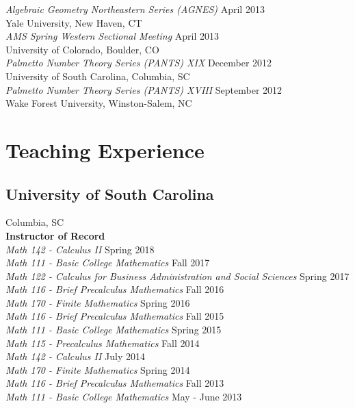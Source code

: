 \documentclass{article}
\begin{document}
  \noindent\textsl{Algebraic Geometry Northeastern Series (AGNES)} \hfill April 2013\\
  Yale University, New Haven, CT\\

  \noindent\textsl{AMS Spring Western Sectional Meeting} \hfill April 2013\\
  University of Colorado, Boulder, CO\\

  \noindent\textsl{Palmetto Number Theory Series (PANTS) XIX} \hfill December 2012\\
  University of South Carolina, Columbia, SC\\

  \noindent\textsl{Palmetto Number Theory Series (PANTS) XVIII} \hfill September 2012\\
  Wake Forest University, Winston-Salem, NC\\

  \section*{Teaching Experience}
  \subsection*{University of South Carolina}
  \noindent Columbia, SC\\
  
  \noindent\textbf{Instructor of Record}\\
  \textsl{Math 142 - Calculus II} \hfill Spring 2018\\
  \textsl{Math 111 - Basic College Mathematics} \hfill Fall 2017\\
  \textsl{Math 122 - Calculus for Business Administration and Social Sciences} \hfill Spring 2017\\
  \textsl{Math 116 - Brief Precalculus Mathematics} \hfill Fall 2016\\
  \textsl{Math 170 - Finite Mathematics} \hfill Spring 2016\\
  \textsl{Math 116 - Brief Precalculus Mathematics} \hfill Fall 2015\\
  \textsl{Math 111 - Basic College Mathematics} \hfill Spring 2015\\
  \textsl{Math 115 - Precalculus Mathematics} \hfill Fall 2014\\
  \textsl{Math 142 - Calculus II} \hfill July 2014\\
  \textsl{Math 170 - Finite Mathematics} \hfill Spring 2014\\
  \textsl{Math 116 - Brief Precalculus Mathematics} \hfill Fall 2013\\
  \textsl{Math 111 - Basic College Mathematics} \hfill May - June 2013\\
\end{document}
